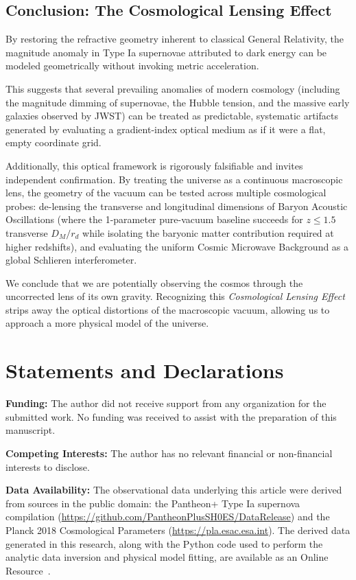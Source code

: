 \documentclass[11pt]{article}
\begin{document}
\subsection{Conclusion: The Cosmological Lensing Effect}
By restoring the refractive geometry inherent to classical General Relativity, the magnitude anomaly in Type Ia supernovae attributed to dark energy can be modeled geometrically without invoking metric acceleration.

This suggests that several prevailing anomalies of modern cosmology (including the magnitude dimming of supernovae, the Hubble tension, and the massive early galaxies observed by JWST) can be treated as predictable, systematic artifacts generated by evaluating a gradient-index optical medium as if it were a flat, empty coordinate grid. 

Additionally, this optical framework is rigorously falsifiable and invites independent confirmation. By treating the universe as a continuous macroscopic lens, the geometry of the vacuum can be tested across multiple cosmological probes: de-lensing the transverse and longitudinal dimensions of Baryon Acoustic Oscillations (where the 1-parameter pure-vacuum baseline succeeds for $z \le 1.5$ transverse $D_M/r_d$ while isolating the baryonic matter contribution required at higher redshifts), and evaluating the uniform Cosmic Microwave Background as a global Schlieren interferometer.

We conclude that we are potentially observing the cosmos through the uncorrected lens of its own gravity. Recognizing this \textit{Cosmological Lensing Effect} strips away the optical distortions of the macroscopic vacuum, allowing us to approach a more physical model of the universe.

\section*{Statements and Declarations}

\textbf{Funding:} The author did not receive support from any organization for the submitted work. No funding was received to assist with the preparation of this manuscript.

\textbf{Competing Interests:} The author has no relevant financial or non-financial interests to disclose.

\textbf{Data Availability:} The observational data underlying this article were derived from sources in the public domain: the Pantheon+ Type Ia supernova compilation (\url{https://github.com/PantheonPlusSH0ES/DataRelease}) and the Planck 2018 Cosmological Parameters (\url{https://pla.esac.esa.int}). The derived data generated in this research, along with the Python code used to perform the analytic data inversion and physical model fitting, are available as an Online Resource~\cite{RefractivePackage2026}.
\end{document}
